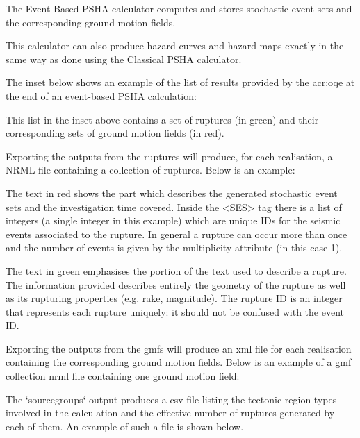 The Event Based PSHA calculator computes and stores stochastic event sets and
the corresponding ground motion fields.

This calculator can also produce hazard curves and hazard maps exactly in the
same way as done using the Classical PSHA calculator.

The inset below shows an example of the list of results provided by the
\gls{acr:oqe} at the end of an event-based PSHA calculation:



This list in the inset above contains a set of ruptures (in green)
and their corresponding sets of ground motion fields (in red).

Exporting the outputs from the ruptures will produce, for each
realisation, a NRML file containing a collection of ruptures.
Below is an example:



The text in red shows the part which describes the generated
stochastic event sets and the investigation time covered. Inside the
<SES> tag there is a list of integers (a single integer in this example)
which are unique IDs for the seismic events associated to the rupture.
In general a rupture can occur more than once and the number of events
is given by the multiplicity attribute (in this case 1).

The text in green emphasises the portion of the text used to describe a
rupture. The information provided describes entirely the geometry of the
rupture as well as its rupturing properties (e.g. rake, magnitude). The
rupture ID is an integer that represents each rupture uniquely: it should
not be confused with the event ID.

Exporting the outputs from the gmfs will produce an xml file for each
realisation containing the corresponding ground motion fields. Below is an
example of a gmf collection nrml file containing one ground motion field:



The `sourcegroups` output produces a csv file listing the tectonic region
types involved in the calculation and the effective number of ruptures
generated by each of them. An example of such a file is shown below.


